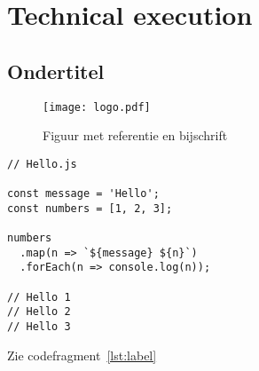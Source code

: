 
\section{Technical execution} %
\label{sec:execution}

\subsection{Ondertitel} %
\label{sub:ondertitel}

\lipsum[1]

\begin{figure}[H]
  \label{figure:golden-circle}
  \centering
  \texttt{[image: logo.pdf]}
  \caption{Figuur met referentie en bijschrift \cite{voorbeeld-ref}}
\end{figure}

\begin{lstlisting}[caption={Some Javascript code},label={lst:label}]
// Hello.js

const message = 'Hello';
const numbers = [1, 2, 3];

numbers
  .map(n => `${message} ${n}`)
  .forEach(n => console.log(n));

// Hello 1
// Hello 2
// Hello 3
\end{lstlisting}

Zie codefragment~\ref{lst:label}

\lipsum[1]
